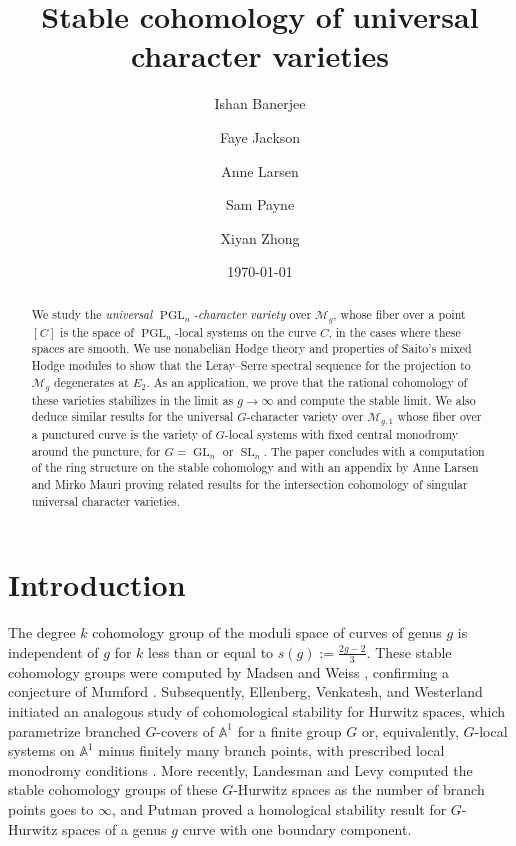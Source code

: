 \documentclass[11pt,reqno]{amsart}
\title{Stable cohomology of universal character varieties}
\author{Ishan Banerjee}
\author{Faye Jackson}
\author{Anne Larsen}
\author{Sam Payne}
\author{Xiyan Zhong}
\date{\today}
\theoremstyle{plain} %
\theoremstyle{definition}
\newcommand{\M}{\mathcal{M}}
\DeclareMathOperator{\GL}{GL}
\DeclareMathOperator{\SL}{SL}
\DeclareMathOperator{\PGL}{PGL}
\renewcommand{\AA}{\mathbb{A}}
\begin{document}
\begin{abstract}
    We study the \textit{universal $\PGL_n$-character variety} over $\M_{g}$, whose fiber over a point $[C]$ is the space of $\PGL_n$-local systems on the curve $C$, in the cases where these spaces are smooth. We use nonabelian Hodge theory and properties of Saito's mixed Hodge modules to show that the Leray--Serre spectral sequence for the projection to $\M_g$ degenerates at $E_2$.  As an application, we prove that the rational cohomology of these varieties stabilizes in the limit as $g \to \infty$ and compute the stable limit. We also deduce similar results for the universal $G$-character variety over $\M_{g,1}$ whose fiber over a punctured curve is the variety of $G$-local systems with fixed central monodromy around the puncture, for $G = \GL_n$ or $\SL_n$. The paper concludes with a computation of the ring structure on the stable cohomology and with an appendix by Anne Larsen and Mirko Mauri proving related results for the intersection cohomology of singular universal character varieties.
    \end{abstract}

\maketitle


\setcounter{tocdepth}{1}
\tableofcontents


\section{Introduction}




The degree $k$ cohomology group of the moduli space of curves of genus $g$ %
is independent of $g$ for $k$ less than or equal to $s(g) :=\frac{2g-2}{3}.$ These stable cohomology groups were computed by Madsen and Weiss \cite{Madsen-Weiss}, confirming a conjecture of Mumford \cite{Mumford83}.
Subsequently, Ellenberg, Venkatesh, and Westerland initiated an analogous study of cohomological stability for Hurwitz spaces, which parametrize branched $G$-covers of $\AA^1$ for a finite group $G$ or, equivalently, $G$-local systems on $\AA^1$ minus finitely many branch points, with prescribed local monodromy conditions  \cite{ellenberg-venkatesh-westerland}. %
More recently, Landesman and Levy computed the stable cohomology groups of these $G$-Hurwitz spaces \cite{landesmann-levy-stable-answer} as the number of branch points goes to $\infty$, and Putman \cite[Theorem C]{Putman-partial} proved a homological stability result for $G$-Hurwitz spaces of a genus $g$ curve with one boundary component.
\end{document}
